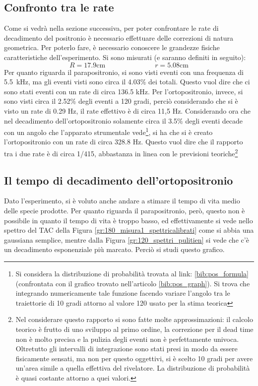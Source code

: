 \subsection{Confronto tra le rate}
Come si vedrà nella sezione successiva, per poter confrontare le rate di decadimento del positronio è necessario effettuare delle correzioni di natura geometrica. Per poterlo
fare, è necessario conoscere le grandezze fisiche caratteristiche dell'esperimento. Si sono misurati (e saranno definiti in seguito):
$$R = 17.9 \text{cm} \hspace{3cm} r =5.08 \text{cm}$$
Per quanto riguarda il parapositronio, si sono visti eventi con una frequenza di 5.5~kHz, ma gli eventi visti sono circa il 4.03\% dei totali. Questo vuol dire che 
ci sono stati eventi con un rate di circa 136.5 kHz. Per l'ortopositronio, invece, si sono visti circa il 2.52\% degli eventi a 120 gradi,
perciò considerando che si è visto un rate
di 0.29 Hz, il rate effettivo è di circa 11,5 Hz. Considerando ora che nel decadimento dell'ortopositronio solamente circa il 3.5\% degli eventi decade con un
angolo che l'apparato strumentale vede\footnote{Si considera la distribuzione di probabilità trovata al link:
\ref{bib:pos_formula} (confrontata con il grafico trovato nell'articolo \ref{bib:pos_graph}).
Si trova che integrando numericamente tale funzione facendo variare l'angolo tra le traiettorie di 10 gradi attorno al valore 120 usato per la stima teorica},
si ha che si è creato l'ortopositronio con un rate di circa 328.8 Hz. Questo vuol dire che il rapporto tra i due rate è di circa 1/415, abbastanza in linea con le previsioni
teoriche\footnote{Nel considerare questo rapporto si sono fatte molte approssimazioni: il calcolo teorico è frutto di uno sviluppo al primo ordine, la correzione per il
dead time non è molto precisa e la pulizia degli eventi non è perfettamente univoca. Oltretutto gli intervalli di integrazione sono stati presi in modo da essere fisicamente
sensati, ma non per questo oggettivi, si è scelto 10 gradi per avere un'area simile a quella effettiva del rivelatore. La distribuzione di probabilità è quasi costante
attorno a quei valori.}

\FloatBarrier
\subsection{Il tempo di decadimento dell'ortopositronio}
Dato l'esperimento, si è voluto anche andare a stimare il tempo di vita medio delle specie prodotte. Per quanto riguarda il parapositronio, però, questo non è
possibile in quanto il tempo di vita è troppo basso, ed effettivamente si vede nello spettro del TAC della Figura \ref{gr:180_misura1_spettricalibrati} come si
abbia una gaussiana semplice, mentre dalla Figura \ref{gr:120_spettri_pulitien} si vede che c'è un decadimento esponenziale più marcato. Perciò si studi questo
grafico.\\

